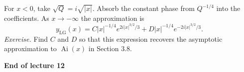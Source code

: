 \documentclass[11pt,a4paper]{article}
\begin{document}
For $x<0$, take $\sqrt{Q}=i\sqrt{|x|}$. Absorb the constant phase
from $Q^{-1/4}$ into the coefficients. As $x\to-\infty$ the
approximation is
\[
    y_{\mathrm{LG}}(x)=C|x|^{-1/4}e^{2i|x|^{3/2}/3}
                      +D|x|^{-1/4}e^{-2i|x|^{3/2}/3}.
\]
\emph{Exercise.} Find $C$ and $D$ so that this expression recovers
the asymptotic approximation to $\operatorname{Ai}(x)$ in Section 3.8.

\begin{center}
    \textbf{End of lecture 12}
\end{center}
\end{document}
